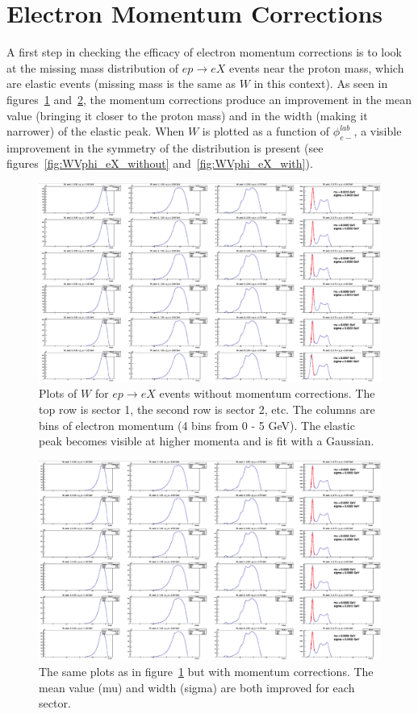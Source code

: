 \section{Electron Momentum Corrections}
\label{sec:eMoCo}
%
A first step in checking the efficacy of electron momentum corrections is to look at the missing mass distribution of $ep \rightarrow eX$ events near the proton mass, which are elastic events (missing mass is the same as $W$ in this context).
As seen in figures~\ref{fig:W_eX_without} and~\ref{fig:W_eX_with}, the momentum corrections produce an improvement in the mean value (bringing it closer to the proton mass) and in the width (making it narrower) of the elastic peak.
When $W$ is plotted as a function of $\phi_{e-}^{lab}$, a visible improvement in the symmetry of the distribution is present (see figures~\ref{fig:WVphi_eX_without} and~\ref{fig:WVphi_eX_with}).
%
\begin{figure}
\centering
\includegraphics[width=8.5in]{figures/W_eX_without.png}
\caption{Plots of $W$ for $ep \rightarrow eX$ events without momentum corrections. The top row is sector 1, the second row is sector 2, etc. The columns are bins of electron momentum (4 bins from 0 - 5 GeV). The elastic peak becomes visible at higher momenta and is fit with a Gaussian.}
\label{fig:W_eX_without}
\end{figure}
%
\begin{figure}
\centering
\includegraphics[width=8.5in]{figures/W_eX_with.png}
\caption{The same plots as in figure~\ref{fig:W_eX_without} but with momentum corrections. The mean value (mu) and width (sigma) are both improved for each sector.}
\label{fig:W_eX_with}
\end{figure}
